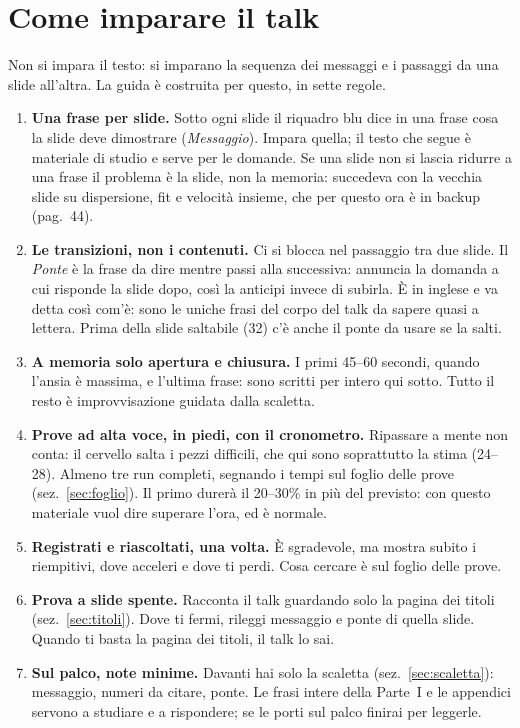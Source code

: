 \documentclass[11pt,a4paper]{article}
\begin{document}
\section{Come imparare il talk}\label{sec:metodo}
Non si impara il testo: si imparano la sequenza dei messaggi e i passaggi da una slide all'altra. La guida è costruita per questo, in sette regole.
\begin{enumerate}[leftmargin=*]
\item \textbf{Una frase per slide.} Sotto ogni slide il riquadro blu dice in una frase cosa la slide deve dimostrare (\emph{Messaggio}). Impara quella; il testo che segue è materiale di studio e serve per le domande. Se una slide non si lascia ridurre a una frase il problema è la slide, non la memoria: succedeva con la vecchia slide su dispersione, fit e velocità insieme, che per questo ora è in backup (pag.~44).
\item \textbf{Le transizioni, non i contenuti.} Ci si blocca nel passaggio tra due slide. Il \emph{Ponte} è la frase da dire mentre passi alla successiva: annuncia la domanda a cui risponde la slide dopo, così la anticipi invece di subirla. \`E in inglese e va detta così com'è: sono le uniche frasi del corpo del talk da sapere quasi a lettera. Prima della slide saltabile (32) c'è anche il ponte da usare se la salti.
\item \textbf{A memoria solo apertura e chiusura.} I primi 45--60 secondi, quando l'ansia è massima, e l'ultima frase: sono scritti per intero qui sotto. Tutto il resto è improvvisazione guidata dalla scaletta.
\item \textbf{Prove ad alta voce, in piedi, con il cronometro.} Ripassare a mente non conta: il cervello salta i pezzi difficili, che qui sono soprattutto la stima (24--28). Almeno tre run completi, segnando i tempi sul foglio delle prove (sez.~\ref{sec:foglio}). Il primo durerà il 20--30\% in più del previsto: con questo materiale vuol dire superare l'ora, ed è normale.
\item \textbf{Registrati e riascoltati, una volta.} \`E sgradevole, ma mostra subito i riempitivi, dove acceleri e dove ti perdi. Cosa cercare è sul foglio delle prove.
\item \textbf{Prova a slide spente.} Racconta il talk guardando solo la pagina dei titoli (sez.~\ref{sec:titoli}). Dove ti fermi, rileggi messaggio e ponte di quella slide. Quando ti basta la pagina dei titoli, il talk lo sai.
\item \textbf{Sul palco, note minime.} Davanti hai solo la scaletta (sez.~\ref{sec:scaletta}): messaggio, numeri da citare, ponte. Le frasi intere della Parte~I e le appendici servono a studiare e a rispondere; se le porti sul palco finirai per leggerle.
\end{enumerate}
\end{document}

